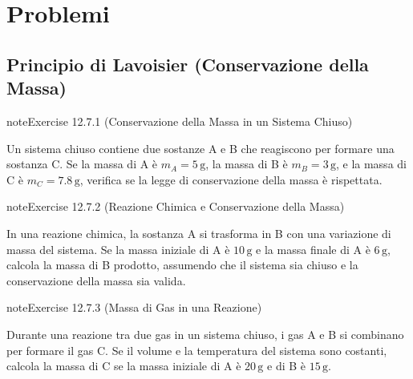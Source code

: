 \documentclass[letterpaper,10pt,italian]{jupyterBook}
\begin{document}
\sphinxstepscope


\section{Problemi}
\label{\detokenize{ch/thermodynamics/principles-problems:problemi}}\label{\detokenize{ch/thermodynamics/principles-problems:physics-hs-thermodynamics-principles-problems}}\label{\detokenize{ch/thermodynamics/principles-problems::doc}}

\subsection{Principio di Lavoisier (Conservazione della Massa)}
\label{\detokenize{ch/thermodynamics/principles-problems:principio-di-lavoisier-conservazione-della-massa}} \label{exercise:ch/thermodynamics/principles-problems-exercise-0}

\begin{sphinxadmonition}{note}{Exercise 12.7.1 (Conservazione della Massa in un Sistema Chiuso)}



\sphinxAtStartPar
Un sistema chiuso contiene due sostanze A e B che reagiscono per formare una sostanza C. Se la massa di A è \(m_A = 5 \, \text{g}\), la massa di B è \(m_B = 3 \, \text{g}\), e la massa di C è \(m_C = 7.8 \, \text{g}\), verifica se la legge di conservazione della massa è rispettata.
\end{sphinxadmonition}
 \label{exercise:ch/thermodynamics/principles-problems-exercise-1}

\begin{sphinxadmonition}{note}{Exercise 12.7.2 (Reazione Chimica e Conservazione della Massa)}



\sphinxAtStartPar
In una reazione chimica, la sostanza A si trasforma in B con una variazione di massa del sistema. Se la massa iniziale di A è \(10 \, \text{g}\) e la massa finale di A è \(6 \, \text{g}\), calcola la massa di B prodotto, assumendo che il sistema sia chiuso e la conservazione della massa sia valida.
\end{sphinxadmonition}
 \label{exercise:ch/thermodynamics/principles-problems-exercise-2}

\begin{sphinxadmonition}{note}{Exercise 12.7.3 (Massa di Gas in una Reazione)}



\sphinxAtStartPar
Durante una reazione tra due gas in un sistema chiuso, i gas A e B si combinano per formare il gas C. Se il volume e la temperatura del sistema sono costanti, calcola la massa di C se la massa iniziale di A è \(20 \, \text{g}\) e di B è \(15 \, \text{g}\).
\end{sphinxadmonition}
 \label{exercise:ch/thermodynamics/principles-problems-exercise-3}
\end{document}
